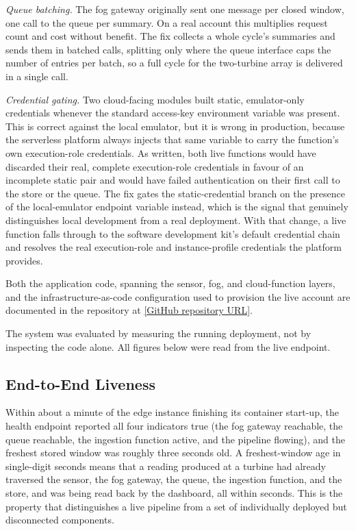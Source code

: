 \documentclass[conference]{IEEEtran}
\begin{document}
\textit{Queue batching.} The fog gateway originally sent one message per closed window, one call to the queue per summary. On a real account this multiplies request count and cost without benefit. The fix collects a whole cycle's summaries and sends them in batched calls, splitting only where the queue interface caps the number of entries per batch, so a full cycle for the two-turbine array is delivered in a single call.

\textit{Credential gating.} Two cloud-facing modules built static, emulator-only credentials whenever the standard access-key environment variable was present. This is correct against the local emulator, but it is wrong in production, because the serverless platform always injects that same variable to carry the function's own execution-role credentials. As written, both live functions would have discarded their real, complete execution-role credentials in favour of an incomplete static pair and would have failed authentication on their first call to the store or the queue. The fix gates the static-credential branch on the presence of the local-emulator endpoint variable instead, which is the signal that genuinely distinguishes local development from a real deployment. With that change, a live function falls through to the software development kit's default credential chain and resolves the real execution-role and instance-profile credentials the platform provides.

Both the application code, spanning the sensor, fog, and cloud-function layers, and the infrastructure-as-code configuration used to provision the live account are documented in the repository at \href{[GitHub repository URL]}{[GitHub repository URL]}.

The system was evaluated by measuring the running deployment, not by inspecting the code alone. All figures below were read from the live endpoint.

\subsection{End-to-End Liveness}

Within about a minute of the edge instance finishing its container start-up, the health endpoint reported all four indicators true (the fog gateway reachable, the queue reachable, the ingestion function active, and the pipeline flowing), and the freshest stored window was roughly three seconds old. A freshest-window age in single-digit seconds means that a reading produced at a turbine had already traversed the sensor, the fog gateway, the queue, the ingestion function, and the store, and was being read back by the dashboard, all within seconds. This is the property that distinguishes a live pipeline from a set of individually deployed but disconnected components.
\end{document}
